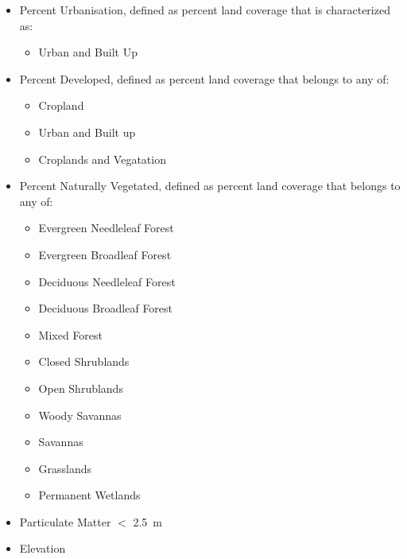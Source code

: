 \documentclass[prl,showpacs,superscriptaddress,twocolumn,longbibliography]{revtex4-1}
\begin{document}
\begin{itemize}
\item Percent Urbanisation, defined as percent land coverage that is characterized as:
\begin{itemize}
	\item Urban and Built Up\cite{nasa_landcov}
\end{itemize}
\item Percent Developed, defined as percent land coverage that belongs to any of:
\begin{itemize}
	\item Cropland
	\item Urban and Built up
	\item Croplands and Vegatation\cite{nasa_landcov}
\end{itemize}
\item Percent Naturally Vegetated, defined as percent land coverage that belongs to any of:
\begin{itemize}
	\item Evergreen Needleleaf Forest
	\item Evergreen Broadleaf Forest
	\item Deciduous Needleleaf Forest
	\item Deciduous Broadleaf Forest
	\item Mixed Forest
	\item Closed Shrublands
	\item Open Shrublands
	\item Woody Savannas
	\item Savannas
	\item Grasslands
	\item Permanent Wetlands\cite{nasa_landcov}
\end{itemize}
\item Particulate Matter $<$ 2.5~{\textmu}m \cite{van_donkelaar_global_2016}
\item Elevation\cite{nasa_srtm}
\end{itemize}
\end{document}
